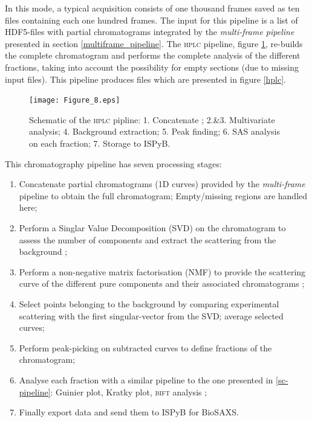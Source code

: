 \documentclass[preprint]{iucr}              %
\begin{document}
In this mode, a typical acquisition consists of one thousand frames saved as ten files containing each one hundred frames.
The input for this pipeline is a list of HDF5-files with partial chromatograms integrated by the \textit{multi-frame pipeline} presented in section \ref{multiframe_pipeline}. 
The \textsc{hplc} pipeline, figure \ref{hplc_worflow}, re-builds the complete chromatogram and performs the complete analysis of the different fractions, taking into account the possibility for empty sections (due to missing input files).
This pipeline produces files which are presented in figure \ref{hplc}.
\begin{figure}
    \label{hplc_worflow}
    \texttt{[image: Figure\_8.eps]}
    \caption{Schematic of the \textsc{hplc} pipline: 
    1. Concatenate ;
    2.\&3. Multivariate analysis;
    4. Background extraction;
    5. Peak finding;
    6. SAS analysis on each fraction;
    7. Storage to ISPyB.}
\end{figure}

This chromatography pipeline has seven processing stages:
\begin{enumerate}
    \item Concatenate partial chromatograms (1D curves) provided by the \textit{multi-frame} pipeline to obtain the full chromatogram; Empty/missing regions are handled here;
    \item Perform a Singlar Value Decomposition (SVD) on the chromatogram to assess the number of components and extract the scattering from the background \cite{BioXTAS}; 
    \item Perform a non-negative matrix factorisation (NMF) to provide the scattering curve of the different pure components and their associated chromatograms \cite{NMF-SEC_SAXS}; 
    \item Select points belonging to the background by comparing experimental scattering with the first singular-vector from the SVD; average selected curves; %
    \item Perform peak-picking on subtracted curves to define fractions of the chromatogram; 
    \item Analyse each fraction with a similar pipeline to the one presented in \ref{sc-pipeline}: Guinier plot, Kratky plot, \textsc{bift} analysis ; %
    \item Finally export data and send them to ISPyB for BioSAXS.
\end{enumerate}
\end{document}
